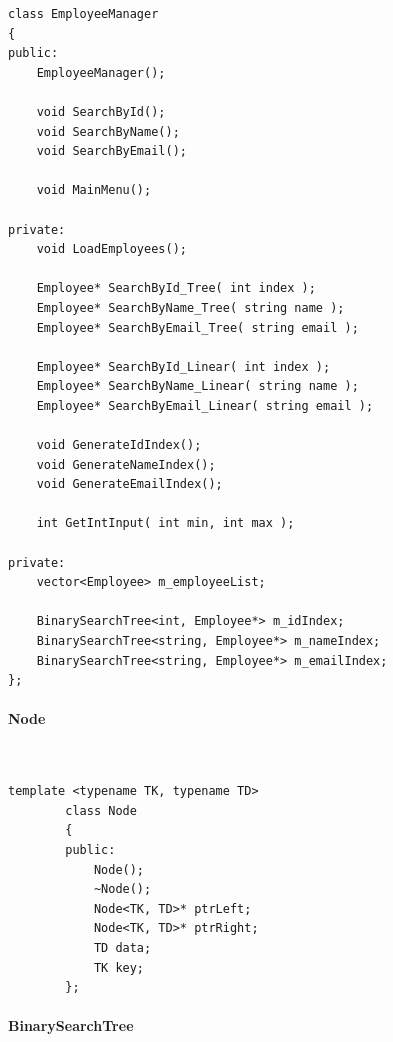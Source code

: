 \documentclass[a4paper,12pt,oneside]{book}
\begin{document}
    \begin{lstlisting}[style=code]
class EmployeeManager
{
public:
    EmployeeManager();

    void SearchById();
    void SearchByName();
    void SearchByEmail();

    void MainMenu();

private:
    void LoadEmployees();

    Employee* SearchById_Tree( int index );
    Employee* SearchByName_Tree( string name );
    Employee* SearchByEmail_Tree( string email );

    Employee* SearchById_Linear( int index );
    Employee* SearchByName_Linear( string name );
    Employee* SearchByEmail_Linear( string email );

    void GenerateIdIndex();
    void GenerateNameIndex();
    void GenerateEmailIndex();

    int GetIntInput( int min, int max );

private:
    vector<Employee> m_employeeList;

    BinarySearchTree<int, Employee*> m_idIndex;
    BinarySearchTree<string, Employee*> m_nameIndex;
    BinarySearchTree<string, Employee*> m_emailIndex;
};
    \end{lstlisting}

\newpage

    \paragraph{Node} ~\\

    \begin{lstlisting}[style=code]
        template <typename TK, typename TD>
        class Node
        {
        public:
            Node();
            ~Node();
            Node<TK, TD>* ptrLeft;
            Node<TK, TD>* ptrRight;
            TD data;
            TK key;
        };
    \end{lstlisting}

    \paragraph{BinarySearchTree} ~\\
\end{document}

